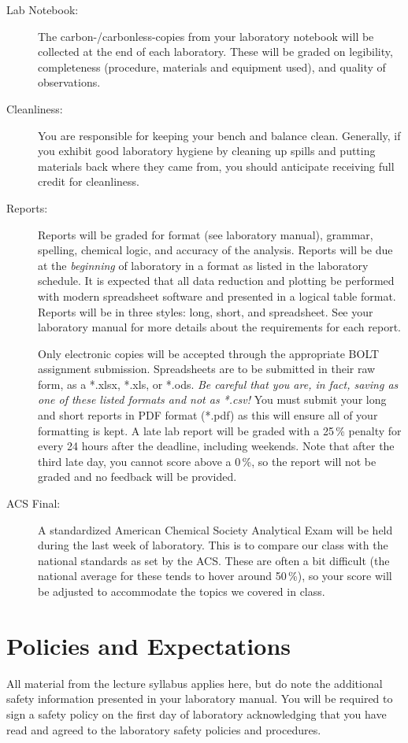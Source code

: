 \documentclass[11pt,letterpaper]{article}
\begin{document}
\begin{description}
	\item[Lab Notebook:] The carbon-/carbonless-copies from your laboratory
		notebook will be collected at the end of each laboratory. These
		will be graded on legibility, completeness (procedure, materials
		and equipment used), and quality of observations. 
	\item[Cleanliness:] You are responsible for keeping your bench and
		balance clean. Generally, if you exhibit good laboratory hygiene
		by cleaning up spills and putting materials back where they came
		from, you should anticipate receiving full credit for
		cleanliness.
	\item[Reports:] Reports will be graded for format (see laboratory
		manual), grammar, spelling, chemical logic, and accuracy of the
		analysis. Reports will be due at the \emph{beginning} of
		laboratory in a format as listed in the laboratory schedule.  It
		is expected that all data reduction and plotting be performed
		with modern spreadsheet software and presented in a logical
		table format.  Reports will be in three styles: long, short, and
		spreadsheet. See your laboratory manual for more details about
		the requirements for each report.
		
		Only electronic copies will be accepted through the appropriate
		BOLT assignment submission. Spreadsheets are to be submitted in
		their raw form, as a *.xlsx, *.xls, or *.ods. \emph{Be careful
			that you are, in fact, saving as one of these listed
		formats and not as *.csv!} You must submit your long and short
		reports in PDF format (*.pdf) as this will ensure all of your
		formatting is kept.  A late lab report will be graded with a
		25\,\% penalty for every 24 hours after the deadline, including
		weekends. Note that after the third late day, you cannot score
		above a 0\,\%, so the report will not be graded and no feedback
		will be provided.

	\item[ACS Final:] A standardized American Chemical Society Analytical
		Exam will be held during the last week of laboratory. This is to compare
		our class with the national standards as set by the ACS. These
		are often a bit difficult (the national average for these tends
		to hover around 50\,\%), so your score will be adjusted to
		accommodate the topics we covered in class. 
\end{description}

\section{Policies and Expectations}
All material from the lecture syllabus applies here, but do note the additional
safety information presented in your laboratory manual. You will be required to
sign a safety policy on the first day of laboratory acknowledging that you have
read and agreed to the laboratory safety policies and procedures.
\end{document}
